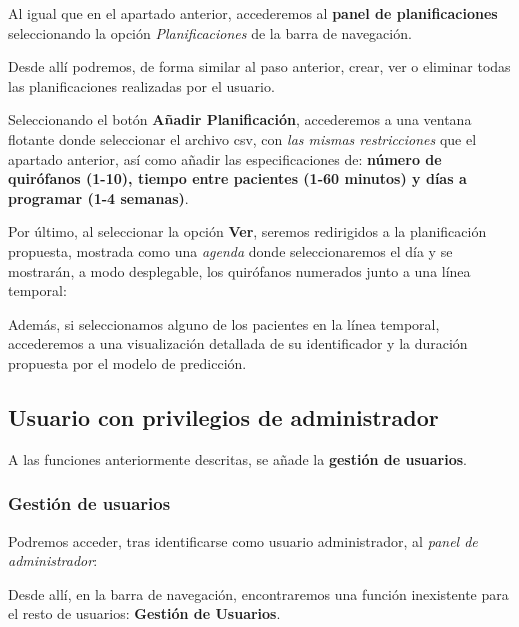 Al igual que en el apartado anterior, accederemos al \textbf{panel de planificaciones} seleccionando la opción \textit{Planificaciones} de la barra de navegación.


Desde allí podremos, de forma similar al paso anterior, crear, ver o eliminar todas las planificaciones realizadas por el usuario.

Seleccionando el botón \textbf{Añadir Planificación}, accederemos a una ventana flotante donde seleccionar el archivo csv, con \textit{las mismas restricciones} que el apartado anterior, así como añadir las especificaciones de: \textbf{número de quirófanos (1-10), tiempo entre pacientes (1-60 minutos) y días a programar (1-4 semanas)}.


Por último, al seleccionar la opción \textbf{Ver}, seremos redirigidos a la planificación propuesta, mostrada como una \textit{agenda} donde seleccionaremos el día y se mostrarán, a modo desplegable, los quirófanos numerados junto a una línea temporal:


Además, si seleccionamos alguno de los pacientes en la línea temporal, accederemos a una visualización detallada de su identificador y la duración propuesta por el modelo de predicción.


\subsection{Usuario con privilegios de administrador}

A las funciones anteriormente descritas, se añade la \textbf{gestión de usuarios}.

\subsubsection{Gestión de usuarios}

Podremos acceder, tras identificarse como usuario administrador, al \textit{panel de administrador}:


Desde allí, en la barra de navegación, encontraremos una función inexistente para el resto de usuarios: \textbf{Gestión de Usuarios}.

